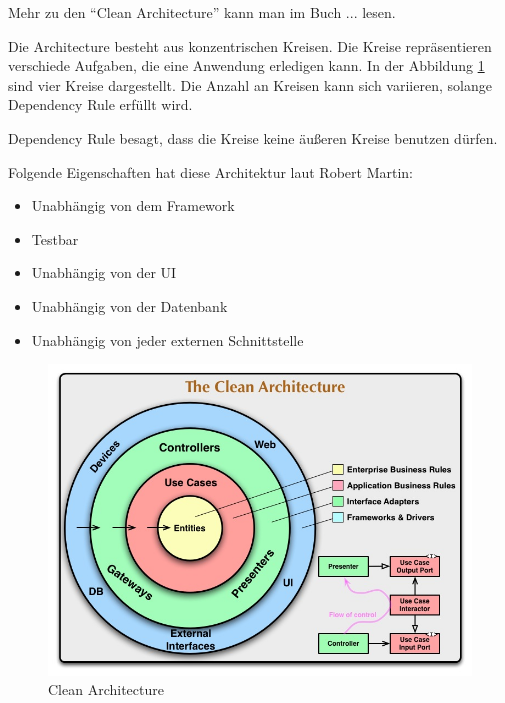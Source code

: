 Mehr zu den ``Clean Architecture'' kann man im Buch ... lesen.

Die Architecture besteht aus konzentrischen Kreisen. Die Kreise repräsentieren verschiede Aufgaben, die eine Anwendung erledigen kann.
In der Abbildung \ref{fig:Clean Architecture} sind vier Kreise dargestellt. Die Anzahl an Kreisen kann sich variieren, solange Dependency Rule erfüllt wird.

Dependency Rule besagt, dass die Kreise keine äußeren Kreise benutzen dürfen.

Folgende Eigenschaften hat diese Architektur laut Robert Martin:
\begin{itemize}
    \item Unabhängig von dem Framework
    \item Testbar
    \item Unabhängig von der UI
    \item Unabhängig von der Datenbank
    \item Unabhängig von jeder externen Schnittstelle
\end{itemize}

\begin{figure}[H]
    \centering
    \includegraphics[width=1\textwidth]{./images/CleanArchitecture.jpg}
    \caption[Clean Architecture]{Clean Architecture \footnotemark}
    \label{fig:Clean Architecture}
\end{figure}
